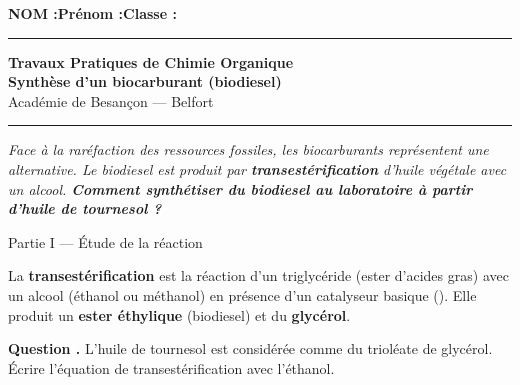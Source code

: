 \documentclass[11pt,a4paper]{article}
\newcommand{\sectitle}[1]{%
  \vspace{6pt}
  \noindent\colorbox{exoheader}{\parbox{\dimexpr\linewidth-2\fboxsep}%
    {\color{white}\bfseries\large\strut\quad #1}}
  \vspace{4pt}
}
\newcounter{question}
\newcommand{\question}{%
  \stepcounter{question}%
  \noindent\textcolor{exoheader}{\textbf{Question \thequestion.}}\quad
}
\begin{document}
\noindent\textbf{NOM :}\hfill\textbf{Prénom :}\hfill\textbf{Classe :}\hfill\phantom{x}\\[0.2cm]
\hrule\vspace{0.2cm}

\begin{center}
  {\large\bfseries\textcolor{exoheader}{Travaux Pratiques de Chimie Organique}}\\[4pt]
  {\LARGE\bfseries Synthèse d'un biocarburant (biodiesel)}\\[2pt]
  {\small Académie de Besançon --- Belfort}
\end{center}
\hrule\vspace{6pt}

\begin{tcolorbox}[enhanced, colback=problemebg, colframe=exoheader, boxrule=1.5pt,
  title={\faFlask\quad Problématique},
  fonttitle=\bfseries\color{white},
  attach boxed title to top left={yshift=-2mm, xshift=4mm},
  boxed title style={colback=exoheader, colframe=exoheader}]
\textit{Face à la raréfaction des ressources fossiles, les biocarburants représentent
une alternative. Le biodiesel est produit par \textbf{transestérification} d'huile végétale avec un alcool.
\textbf{Comment synthétiser du biodiesel au laboratoire à partir d'huile de tournesol ?}}
\end{tcolorbox}

\vspace{6pt}

\sectitle{Partie I --- Étude de la réaction}

\begin{mdframed}[backgroundcolor=exolight, linecolor=exoheader, linewidth=1.2pt]
La \textbf{transestérification} est la réaction d'un triglycéride (ester d'acides gras)
avec un alcool (éthanol ou méthanol) en présence d'un catalyseur basique ().
Elle produit un \textbf{ester éthylique} (biodiesel) et du \textbf{glycérol}.
\end{mdframed}

\vspace{4pt}
\question L'huile de tournesol est considérée comme du trioléate de glycérol.
Écrire l'équation de transestérification avec l'éthanol. \dotfill

\vspace{0.3cm}\noindent\dotfill

\vspace{0.3cm}\noindent\dotfill
\end{document}
